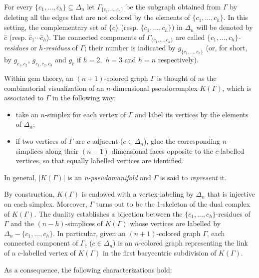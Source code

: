 \documentclass[12pt,a4paper]{article}
\newcommand{\G}{\Gamma}
\begin{document}
\smallskip

For every  $\{c_1, \dots, c_h\} \subseteq\Delta_n$ let $\G_{\{c_1, \dots, c_h\}}$  be the subgraph obtained from $\G$  by deleting all the edges that are not colored by the elements of $\{c_1, \dots, c_h\}$. 
In this setting, the complementary set of $\{c\}$ (resp. $\{c_1,\dots,c_h\}$)  in $\Delta_n$ will be denoted by $\hat c$ (resp. $\hat c_1\cdots\hat c_h$). 
The connected components of $\G_{\{c_1, \dots, c_h\}}$ are called {\it $\{c_1, \dots, c_h\}$-residues} or {\it $h$-residues} of $\G$; their number is indicated by $g_{\{c_1, \dots, c_h\}}$ (or, for short, by $g_{c_1,c_2}$, $g_{c_1,c_2,c_3}$ and $g_{\hat c}$ if $h=2,$ $h=3$ and $h = n$ respectively). 

 \medskip 

Within gem theory, an $(n+1)$-colored graph $\G$ is thought of as the combinatorial visualization of an $n$-dimensional pseudocomplex $K(\G)$, which is associated to $\Gamma$ in the following way:
\begin{itemize}
\item take an $n$-simplex for each vertex of $\G$ and label its vertices by the elements of $\Delta_n$;
\item if two vertices of $\G$ are $c$-adjacent ($c\in\Delta_n$), glue the corresponding $n$-simplices  along their $(n-1)$-dimensional faces opposite to the $c$-labelled vertices, so that equally labelled vertices are identified.
\end{itemize}

\smallskip
In general, $\vert K(\G)\vert$ is an {\it n-pseudomanifold} and $\G$ is said to {\it represent} it. 

\medskip

By construction, $K(\G)$ is endowed with a vertex-labeling by $\Delta_n$ that is injective on each simplex. Moreover, $\G$ turns out to be the 1-skeleton of the dual complex of $K(\G)$.
The duality establishes a bijection between the $\{c_1, \dots, c_h\}$-residues of  $\G$  
and the $(n-h)$-simplices of $K(\G)$ whose vertices are labelled by $\Delta_n - \{c_1, \dots, c_h\}$. 
In particular, given an $(n+1)$-colored graph $\G$, each connected component of $\G_{\hat c}$ ($c\in\Delta_n$) is an $n$-colored graph representing the link of a $c$-labelled vertex of $K(\G)$ in the first barycentric subdivision of $K(\G).$ 

\noindent 

As a consequence, the following characterizations hold: 
\end{document}
